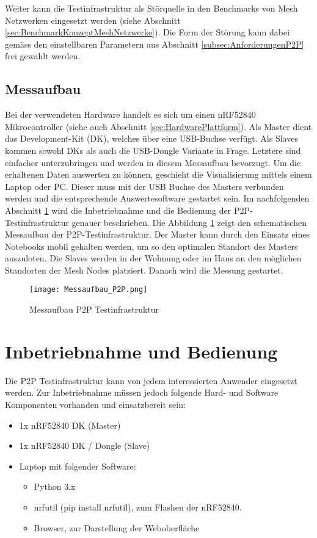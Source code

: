 Weiter kann die Testinfrastruktur als Störquelle in den Benchmarks von Mesh Netzwerken eingesetzt werden (siehe Abschnitt \ref{sec:BenchmarkKonzeptMeshNetzwerke}).
Die Form der Störung kann dabei gemäss den einstellbaren Parametern aus Abschnitt \ref{subsec:AnforderungenP2P} frei gewählt werden.

\subsection{Messaufbau}\label{sec:Messaufbau}
Bei der verwendeten Hardware handelt es sich um einen nRF52840 Mikrocontroller (siehe auch Abschnitt \ref{sec:HardwarePlattform}).
Als Master dient das Development-Kit (DK), welches über eine USB-Buchse verfügt.
Als Slaves kommen sowohl DKs als auch die USB-Dongle Variante in Frage.
Letztere sind einfacher unterzubringen und werden in diesem Messaufbau bevorzugt.
Um die erhaltenen Daten auswerten zu können, geschieht die Visualisierung mittels einem Laptop oder PC.
Dieser muss mit der USB Buchse des Masters verbunden werden und die entsprechende Auswertesoftware gestartet sein.
Im nachfolgenden Abschnitt \ref{sec:InbetriebnahmeBedienungP2P} wird die Inbetriebnahme und die Bedienung der P2P-Testinfrastruktur genauer beschrieben.
Die Abbildung \ref{fig:MessaufbauP2P} zeigt den schematischen Messaufbau der P2P-Testinfrastruktur. Der Master kann durch den Einsatz eines Notebooks mobil gehalten werden, um so den optimalen Standort des Masters auszuloten.
Die Slaves werden in der Wohnung oder im Haus an den möglichen Standorten der Mesh Nodes platziert. Danach wird die Messung gestartet.

\begin{figure} [H]
	\centering
	\texttt{[image: Messaufbau\_P2P.png]}
	\caption{Messaufbau P2P Testinfrastruktur}
	\label{fig:MessaufbauP2P}
\end{figure}


\newpage
\section{Inbetriebnahme und Bedienung}\label{sec:InbetriebnahmeBedienungP2P}
Die P2P Testinfrastruktur kann von jedem interessierten Anwender eingesetzt werden.
Zur Inbetriebnahme müssen jedoch folgende Hard- und Software Komponenten vorhanden und einsatzbereit sein: 

\begin{itemize}
	\item 1x nRF52840 DK (Master)
	\item 1x nRF52840 DK / Dongle (Slave)
	\item Laptop mit folgender Software:
	\begin{itemize}
		\item Python 3.x
		\item nrfutil (pip install nrfutil), zum Flashen der nRF52840.
		\item Browser, zur Darstellung der Weboberfläche
	\end{itemize}
\end{itemize}

